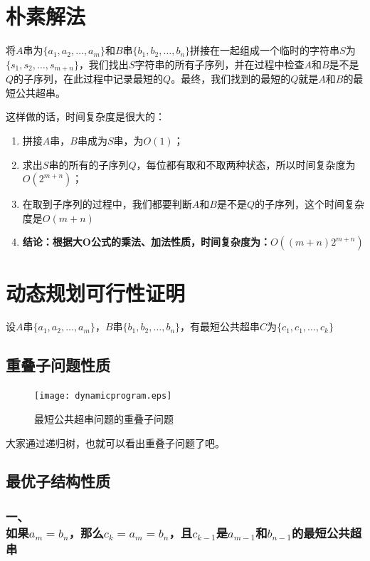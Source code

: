 \documentclass[11pt]{ctexart}
\begin{document}
\section{朴素解法}
将$A$串为$\{a_1, a_2, \dots, a_m\}$和$B$串$\{b_1, b_2, \dots, b_n\}$拼接在一起组成一个临时的字符串$S$为 \\ $\{s_1, s_2,\dots, s_{m+n}\}$，我们找出$S$字符串的所有子序列，并在过程中检查$A$和$B$是不是$Q$的子序列，在此过程中记录最短的$Q$。最终，我们找到的最短的$Q$就是$A$和$B$的最短公共超串。

这样做的话，时间复杂度是很大的：
\begin{enumerate}
    \item 拼接$A$串，$B$串成为$S$串，为$O(1)$；
    \item 求出$S$串的所有的子序列$Q$，每位都有取和不取两种状态，所以时间复杂度为$O(2^{m+n})$；
    \item 在取到子序列的过程中，我们都要判断$A$和$B$是不是$Q$的子序列，这个时间复杂度是$O(m+n)$
    \item \textbf{结论：根据大O公式的乘法、加法性质，时间复杂度为：$O((m+n)2^{m+n})$}
\end{enumerate}

\section{动态规划可行性证明}
设$A$串$\{a_1, a_2, \dots, a_m\}$，$B$串$\{b_1, b_2, \dots, b_n\}$，有最短公共超串$C$为$\{c_1, c_1, \dots, c_k\}$

\subsection{重叠子问题性质}

\begin{figure}[H]
	\centering
	\texttt{[image: dynamicprogram.eps]}
	\caption{最短公共超串问题的重叠子问题}
	\label{}
\end{figure}

大家通过递归树，也就可以看出重叠子问题了吧。

\subsection{最优子结构性质}

\subsubsection*{一、\\如果$a_m=b_n$，那么$c_k=a_m=b_n$，且$c_{k-1}$是$a_{m-1}$和$b_{n-1}$的最短公共超串}
\end{document}
